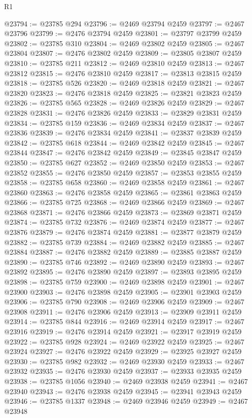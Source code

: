 \begin{lexlean}{R1}
\begin{coremodule}
@23794 := @23785 @294
@23796 := @2469 @23794 @2459
@23797 := @2467 @23796
@23799 := @2476 @23794 @2459
@23801 := @23797 @23799 @2459
@23802 := @23785 @310
@23804 := @2469 @23802 @2459
@23805 := @2467 @23804
@23807 := @2476 @23802 @2459
@23809 := @23805 @23807 @2459
@23810 := @23785 @211
@23812 := @2469 @23810 @2459
@23813 := @2467 @23812
@23815 := @2476 @23810 @2459
@23817 := @23813 @23815 @2459
@23818 := @23785 @526
@23820 := @2469 @23818 @2459
@23821 := @2467 @23820
@23823 := @2476 @23818 @2459
@23825 := @23821 @23823 @2459
@23826 := @23785 @565
@23828 := @2469 @23826 @2459
@23829 := @2467 @23828
@23831 := @2476 @23826 @2459
@23833 := @23829 @23831 @2459
@23834 := @23785 @159
@23836 := @2469 @23834 @2459
@23837 := @2467 @23836
@23839 := @2476 @23834 @2459
@23841 := @23837 @23839 @2459
@23842 := @23785 @618
@23844 := @2469 @23842 @2459
@23845 := @2467 @23844
@23847 := @2476 @23842 @2459
@23849 := @23845 @23847 @2459
@23850 := @23785 @627
@23852 := @2469 @23850 @2459
@23853 := @2467 @23852
@23855 := @2476 @23850 @2459
@23857 := @23853 @23855 @2459
@23858 := @23785 @658
@23860 := @2469 @23858 @2459
@23861 := @2467 @23860
@23863 := @2476 @23858 @2459
@23865 := @23861 @23863 @2459
@23866 := @23785 @725
@23868 := @2469 @23866 @2459
@23869 := @2467 @23868
@23871 := @2476 @23866 @2459
@23873 := @23869 @23871 @2459
@23874 := @23785 @732
@23876 := @2469 @23874 @2459
@23877 := @2467 @23876
@23879 := @2476 @23874 @2459
@23881 := @23877 @23879 @2459
@23882 := @23785 @739
@23884 := @2469 @23882 @2459
@23885 := @2467 @23884
@23887 := @2476 @23882 @2459
@23889 := @23885 @23887 @2459
@23890 := @23785 @746
@23892 := @2469 @23890 @2459
@23893 := @2467 @23892
@23895 := @2476 @23890 @2459
@23897 := @23893 @23895 @2459
@23898 := @23785 @759
@23900 := @2469 @23898 @2459
@23901 := @2467 @23900
@23903 := @2476 @23898 @2459
@23905 := @23901 @23903 @2459
@23906 := @23785 @790
@23908 := @2469 @23906 @2459
@23909 := @2467 @23908
@23911 := @2476 @23906 @2459
@23913 := @23909 @23911 @2459
@23914 := @23785 @844
@23916 := @2469 @23914 @2459
@23917 := @2467 @23916
@23919 := @2476 @23914 @2459
@23921 := @23917 @23919 @2459
@23922 := @23785 @928
@23924 := @2469 @23922 @2459
@23925 := @2467 @23924
@23927 := @2476 @23922 @2459
@23929 := @23925 @23927 @2459
@23930 := @23785 @982
@23932 := @2469 @23930 @2459
@23933 := @2467 @23932
@23935 := @2476 @23930 @2459
@23937 := @23933 @23935 @2459
@23938 := @23785 @1056
@23940 := @2469 @23938 @2459
@23941 := @2467 @23940
@23943 := @2476 @23938 @2459
@23945 := @23941 @23943 @2459
@23946 := @23785 @1337
@23948 := @2469 @23946 @2459
@23949 := @2467 @23948

\end{coremodule}
\end{lexlean}
